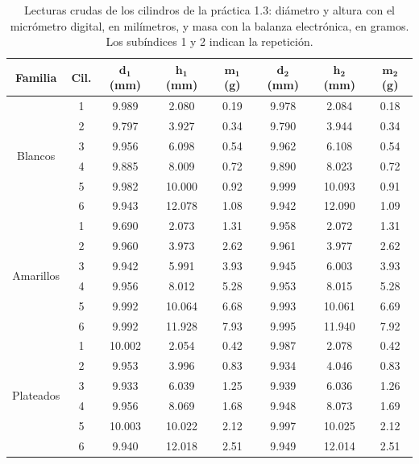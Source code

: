 \begin{table}[!htb]
    \centering
    \small
    \caption{Lecturas crudas de los cilindros de la práctica 1.3: diámetro y altura con el micrómetro digital, en milímetros, y masa con la balanza electrónica, en gramos. Los subíndices 1 y 2 indican la repetición.}
    \label{tab:p13_crudo}
    \begin{tabular}{c c c c c c c c}
        \toprule
        \textbf{Familia} & \textbf{Cil.} & $\bm{d_1}$ (mm) & $\bm{h_1}$ (mm) & $\bm{m_1}$ (g) & $\bm{d_2}$ (mm) & $\bm{h_2}$ (mm) & $\bm{m_2}$ (g) \\
        \midrule
        \multirow{6}{*}{Blancos}
          & 1 & 9.989  & 2.080  & 0.19 & 9.978  & 2.084  & 0.18 \\
          & 2 & 9.797  & 3.927  & 0.34 & 9.790  & 3.944  & 0.34 \\
          & 3 & 9.956  & 6.098  & 0.54 & 9.962  & 6.108  & 0.54 \\
          & 4 & 9.885  & 8.009  & 0.72 & 9.890  & 8.023  & 0.72 \\
          & 5 & 9.982  & 10.000 & 0.92 & 9.999  & 10.093 & 0.91 \\
          & 6 & 9.943  & 12.078 & 1.08 & 9.942  & 12.090 & 1.09 \\
        \midrule
        \multirow{6}{*}{Amarillos}
          & 1 & 9.690  & 2.073  & 1.31 & 9.958  & 2.072  & 1.31 \\
          & 2 & 9.960  & 3.973  & 2.62 & 9.961  & 3.977  & 2.62 \\
          & 3 & 9.942  & 5.991  & 3.93 & 9.945  & 6.003  & 3.93 \\
          & 4 & 9.956  & 8.012  & 5.28 & 9.953  & 8.015  & 5.28 \\
          & 5 & 9.992  & 10.064 & 6.68 & 9.993  & 10.061 & 6.69 \\
          & 6 & 9.992  & 11.928 & 7.93 & 9.995  & 11.940 & 7.92 \\
        \midrule
        \multirow{6}{*}{Plateados}
          & 1 & 10.002 & 2.054  & 0.42 & 9.987  & 2.078  & 0.42 \\
          & 2 & 9.953  & 3.996  & 0.83 & 9.934  & 4.046  & 0.83 \\
          & 3 & 9.933  & 6.039  & 1.25 & 9.939  & 6.036  & 1.26 \\
          & 4 & 9.956  & 8.069  & 1.68 & 9.948  & 8.073  & 1.69 \\
          & 5 & 10.003 & 10.022 & 2.12 & 9.997  & 10.025 & 2.12 \\
          & 6 & 9.940  & 12.018 & 2.51 & 9.949  & 12.014 & 2.51 \\

\end{tabular}
\end{table}
